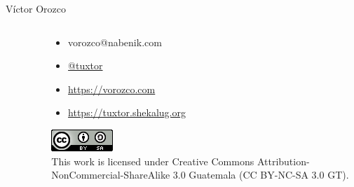 \documentclass[aspectratio=169]{beamer}
\begin{document}
\begin{frame}{Víctor Orozco}
\begin{columns}[T]
\begin{column}[T]{4cm}
\begin{figure}
		\end{figure}
	\end{column}
	\begin{column}[T]{6cm} %
		\begin{itemize}
			\item vorozco@nabenik.com
			\item \href{https://twitter.com/tuxtor}{@tuxtor}
			\item \href{https://vorozco.com}{https://vorozco.com}
			\item \href{https://tuxtor.shekalug.org}{https://tuxtor.shekalug.org}
		\end{itemize}
		\begin{center}
			\includegraphics[width=0.1\linewidth]{Images/cclogo}
			\\
			This work is licensed under Creative Commons Attribution-NonCommercial-ShareAlike 3.0 Guatemala (CC BY-NC-SA 3.0 GT).
		\end{center}
	\end{column}
\end{columns}
\end{frame}
\end{document}
